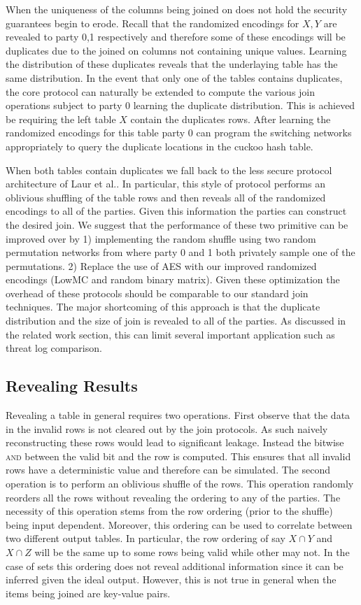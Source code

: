 When the uniqueness of the columns being joined on does not hold the security guarantees begin to erode. Recall that the randomized encodings for $X,Y$ are revealed to party 0,1 respectively and therefore some of these encodings will be duplicates due to the joined on columns not containing unique values. Learning the distribution of these duplicates reveals that the underlaying table has the same distribution. In the event that only one of the tables contains duplicates, the core protocol can naturally be extended to compute the various join operations subject to party 0 learning the duplicate distribution. This is achieved be requiring the left table $X$ contain the duplicates rows. After learning the randomized encodings for this table party 0 can program the switching networks appropriately to query the duplicate locations in the cuckoo hash table. 

When both tables contain duplicates we fall back to the less secure protocol architecture of Laur et al.\cite{LTW13}. In particular, this style of protocol  performs an oblivious shuffling of the table rows and then reveals all of the randomized encodings to all of the parties. Given this information the parties can construct the desired join. We suggest that the performance of these two primitive can be improved over \cite{LTW13} by 1) implementing the random shuffle using two random permutation networks from  where party 0 and 1 both privately sample one of the permutations. 2) Replace the use of AES with our improved randomized encodings (LowMC and random binary matrix). Given these optimization the overhead of these protocols should be comparable to our standard join techniques. The major shortcoming of this approach is that the duplicate distribution and the size of join is revealed to all of the parties. As discussed in the related work section, this can limit several important application such as threat log comparison. 

\subsection{Revealing Results}

Revealing a table in general requires two operations. First observe that the data in the invalid rows is not cleared out by the join protocols. As such naively reconstructing these rows would lead to significant leakage. Instead the bitwise \textsc{and} between the valid bit and the row is computed. This ensures that all invalid rows have a deterministic value and therefore can be simulated. The second operation is to perform an oblivious shuffle of the rows. This operation randomly reorders all the rows without revealing the ordering to any of the parties. The necessity of this operation stems from the  row ordering (prior to the shuffle) being input dependent. Moreover, this ordering can be used to correlate between two different output tables. In particular, the row ordering of say $X\cap Y$ and $X\cap Z$ will be the same up to some rows being valid while other may not. In the case of sets this ordering does not reveal additional information since it can be inferred given the ideal output. However, this is not true in general when the items being joined are key-value pairs. 


